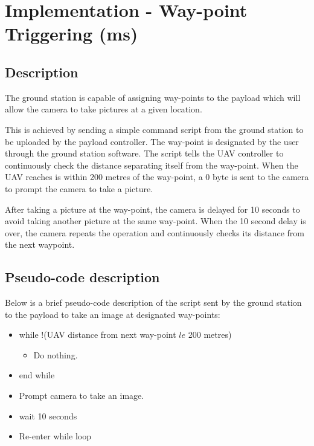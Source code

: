 \section{Implementation - Way-point Triggering (ms)}
\label{sec:waypoint_triggering}

\subsection{Description}

The ground station is capable of assigning way-points to
the payload which will allow the camera to take pictures 
at a given location.

This is achieved by sending a simple command script from
the ground station to be uploaded by the payload 
controller. The way-point is designated by the user
through the ground station software. The script 
tells the UAV controller to continuously check the
distance separating itself from the way-point.
When the UAV reaches is within 200 metres of the
way-point, a 0 byte is sent to the camera to prompt
the camera to take a picture.

After taking a picture at the way-point, the camera
is delayed for 10 seconds to avoid taking another picture
at the same way-point. When the 10 second delay is over,
the camera repeats the operation and continuously checks
its distance from the next waypoint.

\subsection{Pseudo-code description}

Below is a brief pseudo-code description of the script
sent by the ground station to the payload to take an
image at designated way-points:

\begin{itemize}
	\item while !(UAV distance from next way-point $le$ 200 metres)
		\begin{itemize}
			\item Do nothing.
		\end{itemize}
	\item end while
	\item Prompt camera to take an image.
	\item wait 10 seconds
	\item Re-enter while loop
\end{itemize}